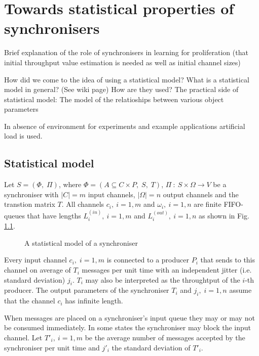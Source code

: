 \chapter{Towards statistical properties of synchronisers}
Brief explanation of the role of synchronisers in learning for proliferation (that initial throughput value estimation is needed as well as initial channel sizes)

How did we come to the idea of using a statistical model?
What is a statistical model in general? (See wiki page) How are they used?
The practical side of statistical model: The model of the relatioships between various object parameters
 
In absence of environment for experiments and example applications artificial load is used.


\section{Statistical model}
Let $S = (\Phi, \; \Pi)$, where $\Phi = (A \subseteq C \times P, \; S, \; T)$, $\Pi \: : \: S \times \Omega \to V$ be a synchroniser with $|C| = m$ input channels, $|\Omega| = n$ output channels and the transtion matrix $T$. All channels $c_{i}, \: i = 1,m$ and $\omega_{i}, \: i=1,n$ are finite FIFO-queues that have lengths $L^{(in)}_{i}, \: i = 1,m$ and $L^{(out)}_{i}, \: i=1,n$ as shown in Fig. \ref{fig:stat_mod}.

  \begin{figure}[h] %
  \scalebox{0.8}{
    
  }
  \caption{A statistical model of a synchroniser}
  \label{fig:stat_mod}
  \end{figure}

Every input channel $c_{i}, \; i = 1,m$ is connected to a producer $P_{i}$ that sends to this channel on average of $T_{i}$ messages per unit time with an independent jitter (i.e. standard deviation) $j_{i}$. $T_{i}$ may also be interpreted as the throughtput of the $i$-th producer. The output parameters of the synchroniser $T_{i}$ and $j_{i}, \; i=1,n$ assume that the channel $c_{i}$ has infinite length.

When messages are placed on a synchroniser's input queue they may or may not be consumed immediately. In some states the synchroniser may block the input channel. Let $T'_{i}, \: i=1,m$ be the average number of messages accepted by the synchroniser per unit time and $j'_{i}$ the standard deviation of $T'_{i}$.

